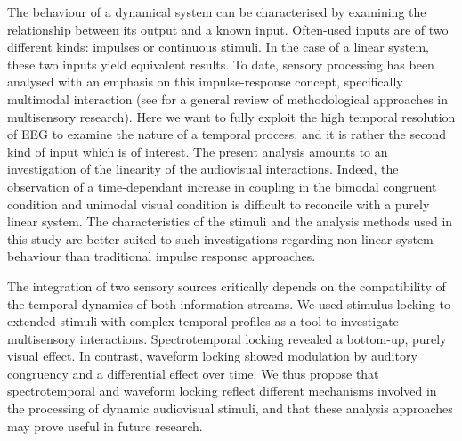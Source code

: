 The behaviour of a dynamical system can be characterised by examining the
relationship between its output and a known input. Often-used inputs are of
two different kinds: impulses or continuous stimuli. In the case of a
linear system, these two inputs yield equivalent results. To date, sensory
processing has been analysed with an emphasis on this impulse-response
concept, specifically multimodal interaction (see \cite{calvert2004a} for a
general review of methodological approaches in multisensory research).
Here we want to fully exploit the high temporal resolution of EEG to
examine the nature of a temporal process, and it is rather the second kind
of input which is of interest. The present analysis amounts to an
investigation of the linearity of the audiovisual interactions. Indeed, the
observation of a time-dependant increase in coupling in the bimodal
congruent condition and unimodal visual condition is difficult to reconcile
with a purely linear system. The characteristics of the stimuli and the
analysis methods used in this study are better suited to such
investigations regarding non-linear system behaviour than traditional
impulse response approaches.



The integration of two sensory sources critically depends on the
compatibility of the temporal dynamics of both information streams. We used
stimulus locking to extended stimuli with complex temporal profiles as a
tool to investigate multisensory interactions. Spectrotemporal locking
revealed a bottom-up, purely visual effect. In contrast, waveform locking
showed modulation by auditory congruency and a differential effect over
time. We thus propose that spectrotemporal and waveform locking reflect
different mechanisms involved in the processing of dynamic audiovisual
stimuli, and that these analysis approaches may prove useful in future
research.
